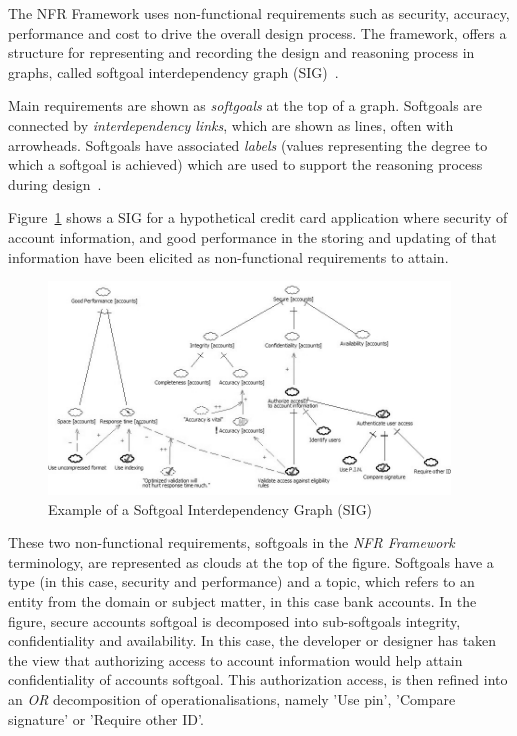\documentclass[dissertation,final]{softeng}
\begin{document}
The NFR Framework uses non-functional requirements such as security, accuracy, performance and cost to drive the overall design process. The framework, offers a structure for representing and recording the design and reasoning process in graphs, called softgoal interdependency graph (SIG)~\citep{Chung2000}. 

Main requirements are shown as \emph{softgoals} at the top of a graph. Softgoals are connected by \emph{interdependency links}, which are shown as lines, often with arrowheads. Softgoals have associated \emph{labels} (values representing the degree to which a softgoal is achieved) which are used to support the reasoning process during design~\citep{Chung2000}. 

Figure~\ref{fig:account_nfrs} shows a SIG for a hypothetical credit card application where security of account information, and good performance in the storing and updating of that information have been elicited as non-functional requirements to attain.

\begin{figure}[h]
\includegraphics[width=0.95\textwidth]{AccountNFRs2}
\centering
\caption[Example of a Softgoal Interdependency Graph]{Example of a Softgoal Interdependency Graph (SIG)~\footnotemark}
\label{fig:account_nfrs}
\end{figure}

These two non-functional requirements, softgoals in the \emph{NFR Framework} terminology, are represented as clouds at the top of the figure. Softgoals have a type (in this case, security and performance) and a topic, which refers to an entity from the domain or subject matter, in this case bank accounts. In the figure, secure accounts softgoal is decomposed into sub-softgoals integrity, confidentiality and availability. In this case, the developer or designer has taken the view that authorizing access to account information would help attain confidentiality of accounts softgoal. This authorization access, is then refined into an \emph{OR} decomposition of operationalisations, namely 'Use pin', 'Compare signature' or 'Require other ID'.
\end{document}
